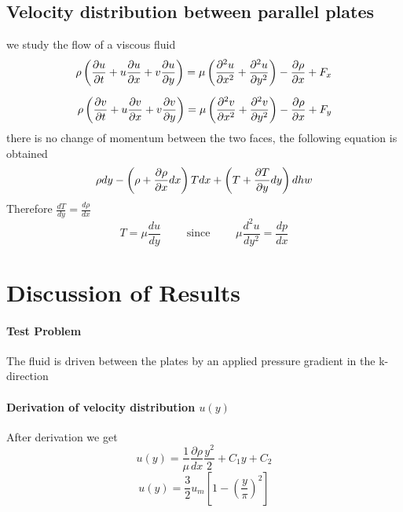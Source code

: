 \documentclass[12pt]{report}
\newcommand{\sps}{\\[0.2cm]}
\newcommand{\dsp}{\displaystyle}
\begin{document}
	\section{Velocity distribution between parallel plates}
	we study the flow of a viscous fluid
	\begin{eqnarray}
		\rho \left(\frac{\partial u}{\partial t} + u\frac{\partial u}{\partial x} + v\frac{\partial u}{\partial y}\right) = \mu\left(\frac{\partial^2u}{\partial x^2} + \frac{\partial^2u}{\partial y^2}\right)- \frac{\partial \rho}{\partial x} + F_x \notag \sps
		\rho \left(\frac{\partial v}{\partial t} + u\frac{\partial v}{\partial x} + v\frac{\partial v}{\partial y}\right) = \mu\left(\frac{\partial^2v}{\partial x^2} + \frac{\partial^2v}{\partial y^2}\right)- \frac{\partial \rho}{\partial x} + F_y \notag
	\end{eqnarray}
	there is no change of momentum between the two faces, the following equation is obtained
	\begin{eqnarray}
		\rho dy - \left(\rho + \frac{\partial\rho}{\partial x}dx\right)T dx + \left(T + \frac{\partial T}{\partial y}dy\right)dhw\notag
	\end{eqnarray}
	Therefore $\dsp \frac{dT}{dy} = \frac{d\rho}{dx}$\sps
	$$
		T = \mu\frac{du}{dy}\qquad \text{ since }\qquad \mu\frac{d^2u}{dy^2} = \frac{dp}{dx}
	$$
	
	
	\chapter{Discussion of Results}
	\subsubsection{Test Problem}
	The fluid is driven between the plates by an applied pressure gradient in the k-direction
	
	\subsubsection{Derivation of velocity distribution $u(y)$}
	After derivation we get
	\begin{equation*}
		u(y) = \frac{1}{\mu}\frac{\partial\rho}{dx}\frac{y^2}{2} + C_1y + C_2
	\end{equation*}
	\begin{equation*}
		u(y) = \frac{3}{2}u_m\left[1 - \left(\frac{y}{\pi}\right)^2\right]
	\end{equation*}
\end{document}

